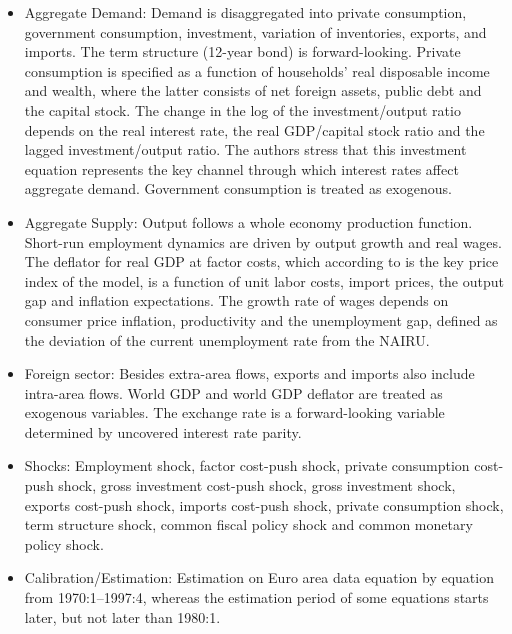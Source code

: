 \documentclass[11pt,a4paper]{article}
\begin{document}
	\begin{itemize}
		\item Aggregate Demand: Demand is disaggregated into private consumption, government consumption, investment, variation of inventories, exports, and imports. The term structure (12-year bond) is forward-looking. Private consumption is specified as a function of households' real disposable income and wealth, where the latter consists of net foreign assets, public debt and the capital stock. The change in the log of the investment/output ratio depends on the real interest rate, the real GDP/capital stock ratio and the lagged investment/output ratio. The authors stress that this investment equation represents the key channel through which interest rates affect aggregate demand. Government consumption is treated as exogenous.
		\item Aggregate Supply: Output follows a whole economy production function.  Short-run employment dynamics are driven by output growth and real wages. The deflator for real GDP at factor costs, which according to \cite{FaganHenryMestre2005} is the key price index of the model, is a function of unit labor costs, import prices, the output gap and inflation expectations. The growth rate of wages depends on consumer price inflation, productivity and the unemployment gap, defined as the deviation of the current unemployment rate from the NAIRU.
		\item Foreign sector: Besides extra-area flows, exports and imports also include intra-area flows. %
		World GDP and world GDP deflator are treated as exogenous variables. The exchange rate is a forward-looking variable determined by uncovered interest rate parity.
		\item Shocks: Employment shock, factor cost-push shock, private consumption cost-push shock, gross investment cost-push shock, gross investment shock, exports cost-push shock, imports cost-push shock, private consumption shock, term structure shock, common fiscal policy shock and common monetary policy shock.
		\item Calibration/Estimation: Estimation on Euro area data equation by equation from 1970:1--1997:4, whereas the estimation period of some equations starts later, but not later than 1980:1.

\end{itemize}
\end{document}
